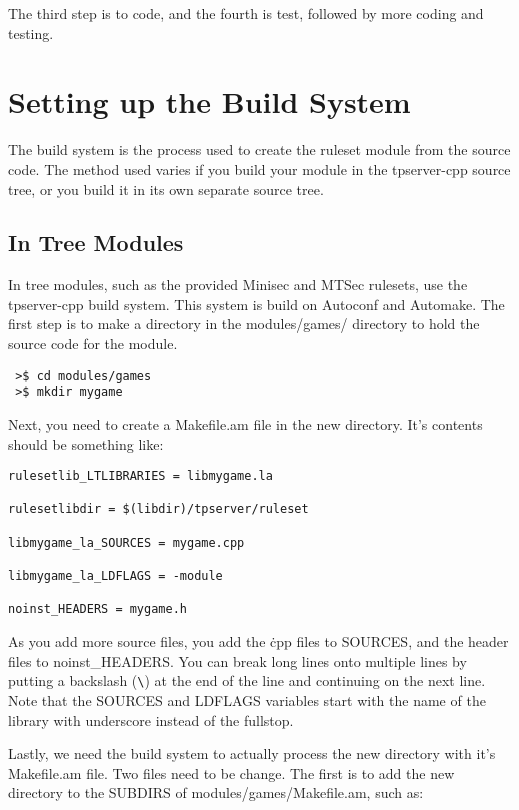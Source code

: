 \documentclass[a4paper,11pt]{report}
\begin{document}
The third step is to code, and the fourth is test, followed by more coding and testing.


\chapter{Setting up the Build System}
\label{chap:build-system}

The build system is the process used to create the ruleset module from the source code. The method used varies if you build your module in the tpserver-cpp source tree, or you build it in its own separate source tree.



\section{In Tree Modules}
\label{sec:intree-module-build}

In tree modules, such as the provided Minisec and MTSec rulesets, use the tpserver-cpp build system. This system is build on Autoconf and Automake.  The first step is to make a directory in the modules/games/ directory to hold the source code for the module. 

\begin{verbatim}
 >$ cd modules/games
 >$ mkdir mygame
\end{verbatim}

Next, you need to create a Makefile.am file in the new directory. It's contents should be something like:

\begin{verbatim}
rulesetlib_LTLIBRARIES = libmygame.la

rulesetlibdir = $(libdir)/tpserver/ruleset

libmygame_la_SOURCES = mygame.cpp

libmygame_la_LDFLAGS = -module

noinst_HEADERS = mygame.h
\end{verbatim}

As you add more source files, you add the \.cpp files to SOURCES, and the header files to noinst\_HEADERS. You can break long lines onto multiple lines by putting a backslash (\verb|\|) at the end of the line and continuing on the next line. Note that the SOURCES and LDFLAGS variables start with the name of the library with underscore instead of the fullstop.

Lastly, we need the build system to actually process the new directory with it's Makefile.am file. Two files need to be change. The first is to add the new directory to the SUBDIRS of modules/games/Makefile.am, such as:
\end{document}
